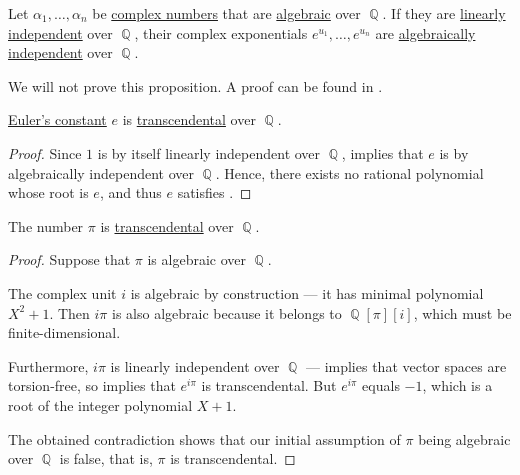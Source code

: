 \begin{theorem}\label{thm:lindemann_weierstrass}
  Let \( \alpha_1, \ldots, \alpha_n \) be \hyperref[def:complex_numbers]{complex numbers} that are \hyperref[def:algebraic_element]{algebraic} over \( \BbbQ \). If they are \hyperref[def:linear_dependence]{linearly independent} over \( \BbbQ \), their complex exponentials \( e^{u_1}, \ldots, e^{u_n} \) are \hyperref[def:algebraic_dependence]{algebraically independent} over \( \BbbQ \).
\end{theorem}
\begin{comments}
  \item We will not prove this proposition. A proof can be found in \cite[277]{Jacobson1985AlgebraI}.
\end{comments}

\begin{corollary}\label{thm:eulers_constant_is_transcendental}
  \hyperref[def:exponential_function]{Euler's constant} \( e \) is \hyperref[def:transcendental_element]{transcendental} over \( \BbbQ \).
\end{corollary}
\begin{proof}
  Since \( 1 \) is by itself linearly independent over \( \BbbQ \),  implies that \( e \) is by algebraically independent over \( \BbbQ \). Hence, there exists no rational polynomial whose root is \( e \), and thus \( e \) satisfies .
\end{proof}

\begin{corollary}\label{thm:pi_is_transcendental}
  The number \hyperref[def:pi]{\( \pi \)} is \hyperref[def:transcendental_element]{transcendental} over \( \BbbQ \).
\end{corollary}
\begin{proof}
  Suppose that \( \pi \) is algebraic over \( \BbbQ \).

  The complex unit \( i \) is algebraic by construction --- it has minimal polynomial \( X^2 + 1 \). Then \( i\pi \) is also algebraic because it belongs to \( \BbbQ[\pi][i] \), which must be finite-dimensional.

  Furthermore, \( i\pi \) is linearly independent over \( \BbbQ \) ---  implies that vector spaces are torsion-free, so  implies that \( e^{i\pi} \) is transcendental. But \( e^{i\pi} \) equals \( -1 \), which is a root of the integer polynomial \( X + 1 \).

  The obtained contradiction shows that our initial assumption of \( \pi \) being algebraic over \( \BbbQ \) is false, that is, \( \pi \) is transcendental.
\end{proof}

